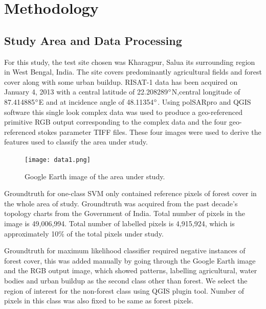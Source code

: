 
\chapter{Methodology} %

\label{Chapter4} %



\section{Study Area and Data Processing}

For this study, the test site chosen was Kharagpur, Salua its surrounding region in West Bengal, India. The site covers predominantly agricultural fields and forest cover along with some urban buildup. RISAT-1 data has been acquired on January 4, 2013 with a central latitude of 22.208289$\degree$N,central longitude of 87.414885$\degree$E and at incidence angle of 48.11354$\degree$. Using polSARpro and QGIS software this single look complex data was used to produce a geo-referenced primitive RGB output corresponding to the complex data and the four geo-referenced stokes parameter TIFF files. These four images were used to derive the features used to classify the area under study.
\begin{figure}[!htbp]
\centering
\texttt{[image: data1.png]}
\caption{Google Earth image of the area under study. }
\label{fig2}
\end{figure}

Groundtruth for one-class SVM only contained reference pixels of forest cover in the whole area of study. Groundtruth was acquired from the past decade's topology charts from the Government of India. Total number of pixels in the image is 49,006,994. Total number of labelled pixels is 4,915,924, which is approximately 10$\%$ of the total pixels under study.

Groundtruth for maximum likelihood classifier required negative instances of forest cover, this was added manually by going through the Google Earth image and the RGB output image, which showed patterns, labelling agricultural, water bodies and urban buildup as the second class other than forest. We select the region of interest for the non-forest class using QGIS plugin tool. Number of pixels in this class was also fixed to be same as forest pixels.

